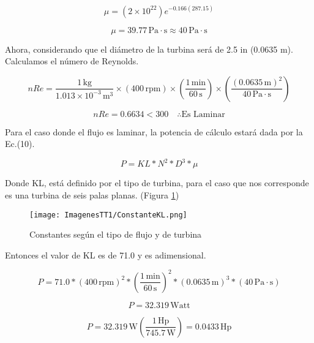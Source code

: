 \documentclass[14pt,oneside]{extarticle} %
\begin{document}
\begin{equation*}
\mu = (2\times10^{22})e^{-0.166(287.15)}
\end{equation*}

\begin{equation*}
\mu = 39.77\, \text{Pa} \cdot \text{s} \approx 40\, \text{Pa} \cdot \text{s}
\end{equation*}

Ahora, considerando que el diámetro de la turbina será de 2.5 in (0.0635 m). Calculamos el número de Reynolds.

\begin{equation*}
nRe = \frac{1\, \text{kg}}{1.013\times10^{-3}\, \text{m}^3} \times (400\, \text{rpm}) \times \left(\frac{1\, \text{min}}{60\, \text{s}}\right) \times \left(\frac{(0.0635\, \text{m})^2}{40\, \text{Pa} \cdot \text{s}}\right)
\end{equation*}

\begin{equation*}
nRe = 0.6634 < 300 \quad \therefore \text{Es Laminar}
\end{equation*}


Para el caso donde el flujo es laminar, la potencia de cálculo estará dada por la Ec.(10).

\begin{equation}
P = KL \ast N^2 \ast D^3 \ast \mu
\end{equation}

Donde KL, está definido por el tipo de turbina, para el caso que nos corresponde es una turbina de seis palas planas. (Figura \ref{fig:Constantes})

\begin{figure}[H]
    \centering
    \texttt{[image: ImagenesTT1/ConstanteKL.png]}
    \caption{Constantes según el tipo de flujo y de turbina}
    \label{fig:Constantes}
\end{figure}

\newpage
Entonces el valor de KL es de 71.0 y es adimensional.

\begin{equation*}
P = 71.0 \ast (400\, \text{rpm})^2 \ast \left(\frac{1\, \text{min}}{60\, \text{s}}\right)^2 \ast (0.0635\, \text{m})^3 \ast (40\, \text{Pa} \cdot \text{s})
\end{equation*}

\begin{equation*}
P = 32.319\, \text{Watt}
\end{equation*}

\begin{equation*}
P = 32.319\, \text{W} \left(\frac{1\, \text{Hp}}{745.7\, \text{W}}\right) = 0.0433\, \text{Hp}
\end{equation*}
\end{document}
